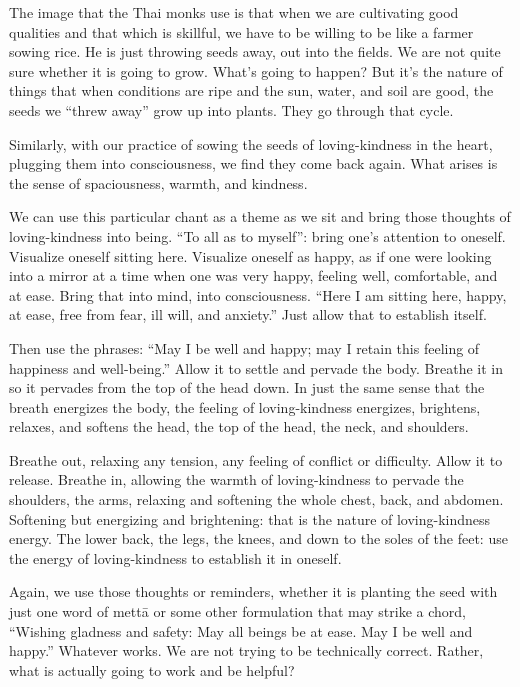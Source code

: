 The image that the Thai monks use is that when we are cultivating good
qualities and that which is skillful, we have to be willing to be like a
farmer sowing rice. He is just throwing seeds away, out into the fields.
We are not quite sure whether it is going to grow. What’s going to
happen? But it’s the nature of things that when conditions are ripe and
the sun, water, and soil are good, the seeds we “threw away” grow up
into plants. They go through that cycle.

Similarly, with our practice of sowing the seeds of loving-kindness in
the heart, plugging them into consciousness, we find they come back
again. What arises is the sense of spaciousness, warmth, and kindness.

We can use this particular chant as a theme as we sit and bring those
thoughts of loving-kindness into being. “To all as to myself”: bring
one’s attention to oneself. Visualize oneself sitting here. Visualize
oneself as happy, as if one were looking into a mirror at a time when
one was very happy, feeling well, comfortable, and at ease. Bring that
into mind, into consciousness. “Here I am sitting here, happy, at ease,
free from fear, ill will, and anxiety.” Just allow that to establish
itself.

Then use the phrases: “May I be well and happy; may I retain this
feeling of happiness and well-being.” Allow it to settle and pervade the
body. Breathe it in so it pervades from the top of the head down. In
just the same sense that the breath energizes the body, the feeling of
loving-kindness energizes, brightens, relaxes, and softens the head, the
top of the head, the neck, and shoulders.

Breathe out, relaxing any tension, any feeling of conflict or
difficulty. Allow it to release. Breathe in, allowing the warmth of
loving-kindness to pervade the shoulders, the arms, relaxing and
softening the whole chest, back, and abdomen. Softening but energizing
and brightening: that is the nature of loving-kindness energy. The lower
back, the legs, the knees, and down to the soles of the feet: use the
energy of loving-kindness to establish it in oneself.

Again, we use those thoughts or reminders, whether it is planting the
seed with just one word of mettā or some other formulation that may
strike a chord, “Wishing gladness and safety: May all beings be at ease.
May I be well and happy.” Whatever works. We are not trying to be
technically correct. Rather, what is actually going to work and be
helpful?


